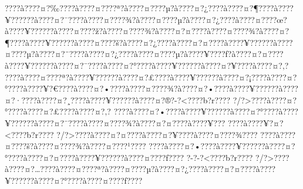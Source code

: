 \documentclass[11pt, openany]{book}
\begin{document}
???\textbar{}?à???\textbar{}?¤?‰???\textbar{}?à???\textbar{}?¤???\textbar{}?ª?à???\textbar{}?¤???\textbar{}?µ?à???\textbar{}?¤?¿???\textbar{}?à???\textbar{}?¤?¶???\textbar{}?à???\textbar{}?¥?????\textbar{}?à???\textbar{}?¤?¯???\textbar{}?à???\textbar{}?¤???\textbar{}?¾?à???\textbar{}?¤???\textbar{}?µ?à???\textbar{}?¤?¿???\textbar{}?à???\textbar{}?¤???\textbar{}?œ?à???\textbar{}?¥?????\textbar{}?à???\textbar{}?¤???\textbar{}?ž?à???\textbar{}?¤???\textbar{}?¾?à???\textbar{}?¤?¤???\textbar{}?à???\textbar{}?¤???\textbar{}?¾?à???\textbar{}?¤?¶???\textbar{}?à???\textbar{}?¥?????\textbar{}?à???\textbar{}?¤???\textbar{}?š?à???\textbar{}?¤?¿???\textbar{}?à???\textbar{}?¤?¤???\textbar{}?à???\textbar{}?¥?????\textbar{}?à???\textbar{}?¤???\textbar{}?µ?à???\textbar{}?¤?¨???\textbar{}?à???\textbar{}?¤?¿???\textbar{}?à???\textbar{}?¤???\textbar{}?µ?à???\textbar{}?¥???\textbar{}?ƒ?à???\textbar{}?¤?¤???\textbar{}?à???\textbar{}?¥?????\textbar{}?à???\textbar{}?¤?¯???\textbar{}?à???\textbar{}?¤?°???\textbar{}?à???\textbar{}?¥?????\textbar{}?à???\textbar{}?¤?¥???\textbar{}?à???\textbar{}?¤?‚?
???\textbar{}?à???\textbar{}?¤???\textbar{}?ª?à???\textbar{}?¥?????\textbar{}?à???\textbar{}?¤?£???\textbar{}?à???\textbar{}?¥?????\textbar{}?à???\textbar{}?¤?¡???\textbar{}?à???\textbar{}?¤?°???\textbar{}?à???\textbar{}?¥?€???\textbar{}?à???\textbar{}?¤?•???\textbar{}?à???\textbar{}?¤???\textbar{}?¾?à???\textbar{}?¤?•???\textbar{}?à???\textbar{}?¥?????\textbar{}?à???\textbar{}?¤?·???\textbar{}?à???\textbar{}?¤?¸???\textbar{}?à???\textbar{}?¥?????\textbar{}?à???\textbar{}?¤?®?-?\textless{}???\textbar{}?b?r???\textbar{}?
?/?\textgreater{}???\textbar{}?à???\textbar{}?¤?°???\textbar{}?à???\textbar{}?¤?£???\textbar{}?à???\textbar{}?¤?‚?
???\textbar{}?à???\textbar{}?¤?•???\textbar{}?à???\textbar{}?¥?????\textbar{}?à???\textbar{}?¤?°???\textbar{}?à???\textbar{}?¥?????\textbar{}?à???\textbar{}?¤?¯???\textbar{}?à???\textbar{}?¤???\textbar{}?¾?à???\textbar{}?¤?¤???\textbar{}?à???\textbar{}?¥???
???\textbar{}?à???\textbar{}?¥?¤?\textless{}???\textbar{}?b?r???\textbar{}?
?/?\textgreater{}???\textbar{}?à???\textbar{}?¤?¤???\textbar{}?à???\textbar{}?¤?¥???\textbar{}?à???\textbar{}?¤???\textbar{}?¾???\textbar{}?
???\textbar{}?à???\textbar{}?¤???\textbar{}?š?à???\textbar{}?¤???\textbar{}?¾?à???\textbar{}?¤???\textbar{}?¹???\textbar{}?
???\textbar{}?à???\textbar{}?¤?•???\textbar{}?à???\textbar{}?¥?????\textbar{}?à???\textbar{}?¤?°???\textbar{}?à???\textbar{}?¤?¤???\textbar{}?à???\textbar{}?¥?????\textbar{}?à???\textbar{}?¤???\textbar{}?ƒ???\textbar{}?
?-?-?\textless{}???\textbar{}?b?r???\textbar{}?
?/?\textgreater{}???\textbar{}?à???\textbar{}?¤?\ldots{}???\textbar{}?à???\textbar{}?¤???\textbar{}?ª?à???\textbar{}?¤???\textbar{}?µ?à???\textbar{}?¤?¿???\textbar{}?à???\textbar{}?¤?¤???\textbar{}?à???\textbar{}?¥?????\textbar{}?à???\textbar{}?¤?°???\textbar{}?à???\textbar{}?¤???\textbar{}?ƒ???\textbar{}?
\end{document}
